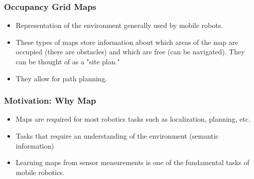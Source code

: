 \begin{frame}
    \frametitle{Occupancy Grid Maps}
    
    \begin{itemize}
    \item Representation of the environment generally used by mobile robots.
    \item These types of maps store information about which areas of the map are occupied (there are obstacles) and which are free (can be navigated). They can be thought of as a "site plan."
    \item They allow for path planning.
    \end{itemize}
    
    \end{frame}
    
    \begin{frame}
    \frametitle{Motivation: Why Map}
    
    \begin{itemize}
    \item Maps are required for most robotics tasks such as localization, planning, etc.
    \item Tasks that require an understanding of the environment (semantic information)
    \item Learning maps from sensor measurements is one of the fundamental tasks of mobile robotics.
    \end{itemize}
\end{frame}

